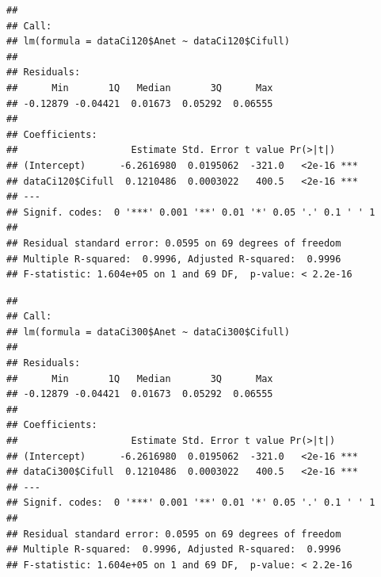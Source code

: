 \documentclass[
]{krantz}
\makeatletter
\newenvironment{Shaded}{\begin{snugshade}}{\end{snugshade}}
\newcommand{\CommentTok}[1]{\textcolor[rgb]{0.56,0.35,0.01}{\textit{#1}}}
\newcommand{\DecValTok}[1]{\textcolor[rgb]{0.00,0.00,0.81}{#1}}
\newcommand{\FunctionTok}[1]{\textcolor[rgb]{0.00,0.00,0.00}{#1}}
\newcommand{\NormalTok}[1]{#1}
\newcommand{\OtherTok}[1]{\textcolor[rgb]{0.56,0.35,0.01}{#1}}
\newcommand{\SpecialCharTok}[1]{\textcolor[rgb]{0.00,0.00,0.00}{#1}}
\newenvironment{kframe}{%
\medskip{}
\setlength{\fboxsep}{.8em}
 \def\at@end@of@kframe{}%
 \ifinner\ifhmode%
  \def\at@end@of@kframe{\end{minipage}}%
  \begin{minipage}{\columnwidth}%
 \fi\fi%
 \def\FrameCommand##1{\hskip\@totalleftmargin \hskip-\fboxsep
 \colorbox{shadecolor}{##1}\hskip-\fboxsep
     \hskip-\linewidth \hskip-\@totalleftmargin \hskip\columnwidth}%
 \MakeFramed {\advance\hsize-\width
   \@totalleftmargin\z@ \linewidth\hsize
   \@setminipage}}%
 {\par\unskip\endMakeFramed%
 \at@end@of@kframe}
\renewenvironment{Shaded}{\begin{kframe}}{\end{kframe}}
\makeatother
\begin{document}
\begin{verbatim}
## 
## Call:
## lm(formula = dataCi120$Anet ~ dataCi120$Cifull)
## 
## Residuals:
##      Min       1Q   Median       3Q      Max 
## -0.12879 -0.04421  0.01673  0.05292  0.06555 
## 
## Coefficients:
##                    Estimate Std. Error t value Pr(>|t|)    
## (Intercept)      -6.2616980  0.0195062  -321.0   <2e-16 ***
## dataCi120$Cifull  0.1210486  0.0003022   400.5   <2e-16 ***
## ---
## Signif. codes:  0 '***' 0.001 '**' 0.01 '*' 0.05 '.' 0.1 ' ' 1
## 
## Residual standard error: 0.0595 on 69 degrees of freedom
## Multiple R-squared:  0.9996, Adjusted R-squared:  0.9996 
## F-statistic: 1.604e+05 on 1 and 69 DF,  p-value: < 2.2e-16
\end{verbatim}

\begin{Shaded}
\end{Shaded}

\begin{verbatim}
## 
## Call:
## lm(formula = dataCi300$Anet ~ dataCi300$Cifull)
## 
## Residuals:
##      Min       1Q   Median       3Q      Max 
## -0.12879 -0.04421  0.01673  0.05292  0.06555 
## 
## Coefficients:
##                    Estimate Std. Error t value Pr(>|t|)    
## (Intercept)      -6.2616980  0.0195062  -321.0   <2e-16 ***
## dataCi300$Cifull  0.1210486  0.0003022   400.5   <2e-16 ***
## ---
## Signif. codes:  0 '***' 0.001 '**' 0.01 '*' 0.05 '.' 0.1 ' ' 1
## 
## Residual standard error: 0.0595 on 69 degrees of freedom
## Multiple R-squared:  0.9996, Adjusted R-squared:  0.9996 
## F-statistic: 1.604e+05 on 1 and 69 DF,  p-value: < 2.2e-16
\end{verbatim}

\begin{Shaded}
\end{Shaded}
\end{document}
